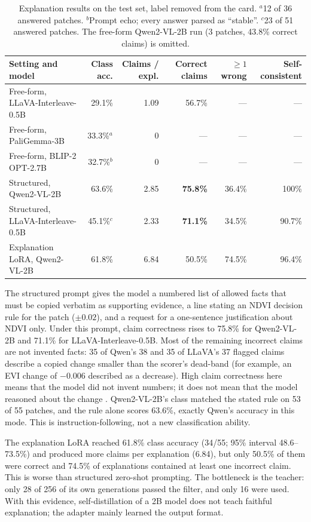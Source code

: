 \documentclass[11pt]{article}
\begin{document}
\begin{table}[t]
\centering
\small
\begin{tabular}{lrrrrr}
\toprule
Setting and model & Class acc. & Claims / expl. & Correct claims & $\ge 1$ wrong & Self-consistent \\
\midrule
Free-form, LLaVA-Interleave-0.5B & 29.1\% & 1.09 & 56.7\% & --- & --- \\
Free-form, PaliGemma-3B & 33.3\%$^{a}$ & 0 & --- & --- & --- \\
Free-form, BLIP-2 OPT-2.7B & 32.7\%$^{b}$ & 0 & --- & --- & --- \\
\midrule
Structured, Qwen2-VL-2B & 63.6\% & 2.85 & \textbf{75.8\%} & 36.4\% & 100\% \\
Structured, LLaVA-Interleave-0.5B & 45.1\%$^{c}$ & 2.33 & \textbf{71.1\%} & 34.5\% & 90.7\% \\
\midrule
Explanation LoRA, Qwen2-VL-2B & 61.8\% & 6.84 & 50.5\% & 74.5\% & 96.4\% \\
\bottomrule
\end{tabular}
\caption{Explanation results on the test set, label removed from the
card. $^{a}$12 of 36 answered patches. $^{b}$Prompt echo; every answer
parsed as ``stable''. $^{c}$23 of 51 answered patches. The free-form
Qwen2-VL-2B run (3 patches, 43.8\% correct claims) is omitted.}
\label{tab:explain}
\end{table}

The structured prompt gives the model a numbered list of allowed facts
that must be copied verbatim as supporting evidence, a line stating an
NDVI decision rule for the patch ($\pm 0.02$), and a request for a
one-sentence justification about NDVI only. Under this prompt, claim
correctness rises to 75.8\% for Qwen2-VL-2B and 71.1\% for
LLaVA-Interleave-0.5B. Most of the remaining incorrect claims are not
invented facts: 35 of Qwen's 38 and 35 of LLaVA's 37 flagged claims
describe a copied change smaller than the scorer's dead-band (for
example, an EVI change of $-0.006$ described as a decrease). High claim
correctness here means that the model did not invent numbers; it does
not mean that the model reasoned about the change
. Qwen2-VL-2B's class matched the stated
rule on 53 of 55 patches, and the rule alone scores 63.6\%, exactly
Qwen's accuracy in this mode. This is instruction-following, not a new
classification ability.

The explanation LoRA reached 61.8\% class accuracy (34/55; 95\% interval
48.6--73.5\%) and produced more claims per explanation (6.84), but only
50.5\% of them were correct and 74.5\% of explanations contained at
least one incorrect claim. This is worse than structured zero-shot
prompting. The bottleneck is the teacher: only 28 of 256 of its own
generations passed the filter, and only 16 were used. With this
evidence, self-distillation of a 2B model does not teach faithful
explanation; the adapter mainly learned the output format.
\end{document}
